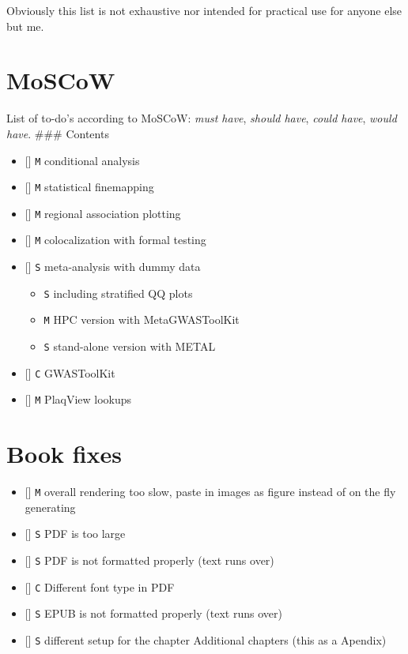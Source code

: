 \documentclass[
]{book}
\providecommand{\tightlist}{%
  \setlength{\itemsep}{0pt}\setlength{\parskip}{0pt}}
\begin{document}
Obviously this list is not exhaustive nor intended for practical use for anyone else but me.

\hypertarget{moscow}{%
\section{MoSCoW}\label{moscow}}

List of to-do's according to MoSCoW: \emph{must have}, \emph{should have}, \emph{could have}, \emph{would have}.
\#\#\# Contents

\begin{itemize}
\tightlist
\item
  {[}{]} \texttt{M} conditional analysis
\item
  {[}{]} \texttt{M} statistical finemapping
\item
  {[}{]} \texttt{M} regional association plotting
\item
  {[}{]} \texttt{M} colocalization with formal testing
\item
  {[}{]} \texttt{S} meta-analysis with dummy data

  \begin{itemize}
  \tightlist
  \item
    \texttt{S} including stratified QQ plots
  \item
    \texttt{M} HPC version with MetaGWASToolKit
  \item
    \texttt{S} stand-alone version with METAL
  \end{itemize}
\item
  {[}{]} \texttt{C} GWASToolKit
\item
  {[}{]} \texttt{M} PlaqView lookups
\end{itemize}

\hypertarget{book-fixes}{%
\section{Book fixes}\label{book-fixes}}

\begin{itemize}
\tightlist
\item
  {[}{]} \texttt{M} overall rendering too slow, paste in images as figure instead of on the fly generating
\item
  {[}{]} \texttt{S} PDF is too large
\item
  {[}{]} \texttt{S} PDF is not formatted properly (text runs over)
\item
  {[}{]} \texttt{C} Different font type in PDF
\item
  {[}{]} \texttt{S} EPUB is not formatted properly (text runs over)
\item
  {[}{]} \texttt{S} different setup for the chapter Additional chapters (this as a Apendix)
\end{itemize}
\end{document}
